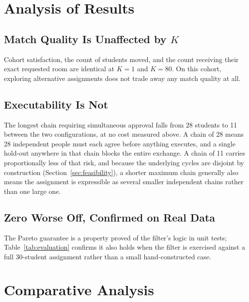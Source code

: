 \documentclass[11pt,a4paper]{report}
\begin{document}
\section{Analysis of Results}

\subsection{Match Quality Is Unaffected by $K$}

Cohort satisfaction, the count of students moved, and the count
receiving their exact requested room are identical at $K=1$ and
$K=80$. On this cohort, exploring alternative assignments does not
trade away any match quality at all.

\subsection{Executability Is Not}

The longest chain requiring simultaneous approval falls from 28
students to 11 between the two configurations, at no cost measured
above. A chain of 28 means 28 independent people must each agree
before anything executes, and a single hold-out anywhere in that chain
blocks the entire exchange. A chain of 11 carries proportionally less
of that risk, and because the underlying cycles are disjoint by
construction (Section~\ref{sec:feasibility}), a shorter maximum chain
generally also means the assignment is expressible as several smaller
independent chains rather than one large one.

\subsection{Zero Worse Off, Confirmed on Real Data}

The Pareto guarantee is a property proved of the filter's logic in
unit tests; Table~\ref{tab:evaluation} confirms it also holds when the
filter is exercised against a full 30-student assignment rather than a
small hand-constructed case.

\section{Comparative Analysis}
\end{document}

